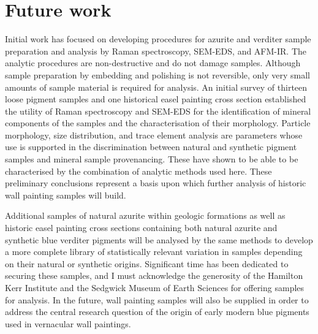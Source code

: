 



\chapter{Future work} %

Initial work has focused on developing procedures for azurite and verditer sample preparation and analysis by Raman spectroscopy, SEM-EDS, and AFM-IR. The analytic procedures are non-destructive and do not damage samples. Although sample preparation by embedding and polishing is not reversible, only very small amounts of sample material is required for analysis. An initial survey of thirteen loose pigment samples and one historical easel painting cross section established the utility of Raman spectroscopy and SEM-EDS for the identification of mineral components of the samples and the characterisation of their morphology. Particle morphology, size distribution, and trace element analysis are parameters whose use is supported in the discrimination between natural and synthetic pigment samples and mineral sample provenancing. These have shown to be able to be characterised by the combination of analytic methods used here. These preliminary conclusions represent a basis upon which further analysis of historic wall painting samples will build.

Additional samples of natural azurite within geologic formations as well as historic easel painting cross sections containing both natural azurite and synthetic blue verditer pigments will be analysed by the same methods to develop a more complete library of statistically relevant variation in samples depending on their natural or synthetic origins. Significant time has been dedicated to securing these samples, and I must acknowledge the generosity of the Hamilton Kerr Institute and the Sedgwick Museum of Earth Sciences for offering samples for analysis. In the future, wall painting samples will also be supplied in order to address the central research question of the origin of early modern blue pigments used in vernacular wall paintings. 

